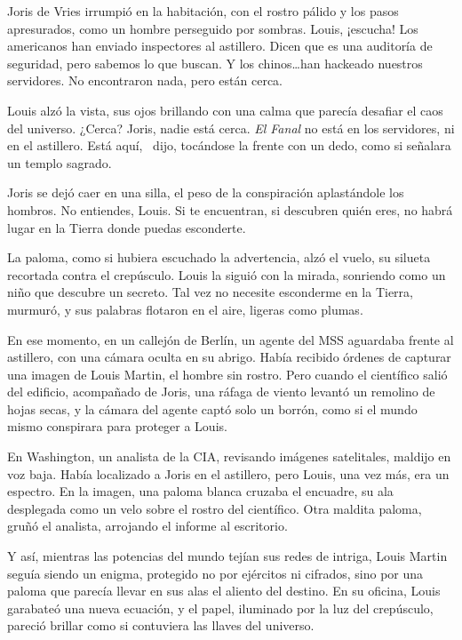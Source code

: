 Joris de Vries irrumpió en la habitación, con el rostro pálido y los pasos apresurados, como un hombre perseguido por sombras. \glqq Louis, ¡escucha! Los americanos han enviado inspectores al astillero. Dicen que es una auditoría de seguridad, pero sabemos lo que buscan. Y los chinos\ldots han hackeado nuestros servidores. No encontraron nada, pero están cerca.\grqq

Louis alzó la vista, sus ojos brillando con una calma que parecía desafiar el caos del universo. \glqq ¿Cerca? Joris, nadie está cerca. \emph{El Fanal} no está en los servidores, ni en el astillero. Está aquí,\grqq~ dijo, tocándose la frente con un dedo, como si señalara un templo sagrado.

Joris se dejó caer en una silla, el peso de la conspiración aplastándole los hombros. \glqq No entiendes, Louis. Si te encuentran, si descubren quién eres, no habrá lugar en la Tierra donde puedas esconderte.\grqq

La paloma, como si hubiera escuchado la advertencia, alzó el vuelo, su silueta recortada contra el crepúsculo. Louis la siguió con la mirada, sonriendo como un niño que descubre un secreto. \glqq Tal vez no necesite esconderme en la Tierra,\grqq~ murmuró, y sus palabras flotaron en el aire, ligeras como plumas.

En ese momento, en un callejón de Berlín, un agente del MSS aguardaba frente al astillero, con una cámara oculta en su abrigo. Había recibido órdenes de capturar una imagen de Louis Martin, el hombre sin rostro. Pero cuando el científico salió del edificio, acompañado de Joris, una ráfaga de viento levantó un remolino de hojas secas, y la cámara del agente captó solo un borrón, como si el mundo mismo conspirara para proteger a Louis.

En Washington, un analista de la CIA, revisando imágenes satelitales, maldijo en voz baja. Había localizado a Joris en el astillero, pero Louis, una vez más, era un espectro. En la imagen, una paloma blanca cruzaba el encuadre, su ala desplegada como un velo sobre el rostro del científico. \glqq Otra maldita paloma,\grqq~ gruñó el analista, arrojando el informe al escritorio.

Y así, mientras las potencias del mundo tejían sus redes de intriga, Louis Martin seguía siendo un enigma, protegido no por ejércitos ni cifrados, sino por una paloma que parecía llevar en sus alas el aliento del destino. En su oficina, Louis garabateó una nueva ecuación, y el papel, iluminado por la luz del crepúsculo, pareció brillar como si contuviera las llaves del universo.
